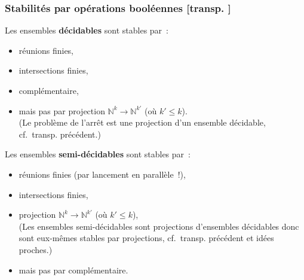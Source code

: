 \documentclass[mathserif,a4paper,aspectratio=169]{beamer}
\renewcommand{\frametitle}[1]{\subsubsection*{#1 {\footnotesize[transp. \insertframenumber]}}}
\begin{document}
\begin{frame}
\frametitle{Stabilités par opérations booléennes}

Les ensembles \textbf{décidables} sont stables par :
\begin{itemize}
\item réunions finies,
\item intersections finies,
\item complémentaire,
\item \alert{mais pas par} projection $\mathbb{N}^k \to
  \mathbb{N}^{k'}$ (où $k'\leq k$).\\ {\footnotesize (Le problème de
    l'arrêt est une projection d'un ensemble décidable,
    cf. transp. précédent.)}
\end{itemize}

\bigskip

Les ensembles \textbf{semi-décidables} sont stables par :
\begin{itemize}
\item réunions finies (par lancement en parallèle !),
\item intersections finies,
\item projection $\mathbb{N}^k \to \mathbb{N}^{k'}$ (où $k'\leq
  k$),\\ {\footnotesize (Les ensembles semi-décidables sont
    projections d'ensembles décidables donc sont eux-mêmes stables par
    projections, cf. transp. précédent et idées proches.)}
\item \alert{mais pas par complémentaire}.
\end{itemize}

\end{frame}
%
\end{document}
